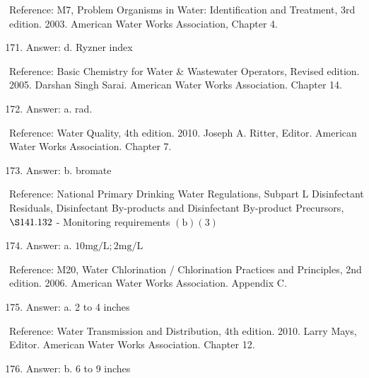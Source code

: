 \documentclass[10pt]{article}
\begin{document}
Reference: M7, Problem Organisms in Water: Identification and Treatment, 3rd edition. 2003. American Water Works Association, Chapter 4.

\begin{enumerate}
  \setcounter{enumi}{170}
  \item Answer: d. Ryzner index
\end{enumerate}

Reference: Basic Chemistry for Water \& Wastewater Operators, Revised edition. 2005. Darshan Singh Sarai. American Water Works Association. Chapter 14.

\begin{enumerate}
  \setcounter{enumi}{171}
  \item Answer: a. rad.
\end{enumerate}

Reference: Water Quality, 4th edition. 2010. Joseph A. Ritter, Editor. American Water Works Association. Chapter 7.

\begin{enumerate}
  \setcounter{enumi}{172}
  \item Answer: b. bromate
\end{enumerate}

Reference: National Primary Drinking Water Regulations, Subpart L Disinfectant Residuals, Disinfectant By-products and Disinfectant By-product Precursors, $\S 141.132$ - Monitoring requirements $(\mathrm{b})(3)$

\begin{enumerate}
  \setcounter{enumi}{173}
  \item Answer: a. $10 \mathrm{mg} / \mathrm{L} ; 2 \mathrm{mg} / \mathrm{L}$
\end{enumerate}

Reference: M20, Water Chlorination / Chlorination Practices and Principles, 2nd edition. 2006. American Water Works Association. Appendix C.

\begin{enumerate}
  \setcounter{enumi}{174}
  \item Answer: a. 2 to 4 inches
\end{enumerate}

Reference: Water Transmission and Distribution, 4th edition. 2010. Larry Mays, Editor. American Water Works Association. Chapter 12.

\begin{enumerate}
  \setcounter{enumi}{175}
  \item Answer: b. 6 to 9 inches
\end{enumerate}
\end{document}
